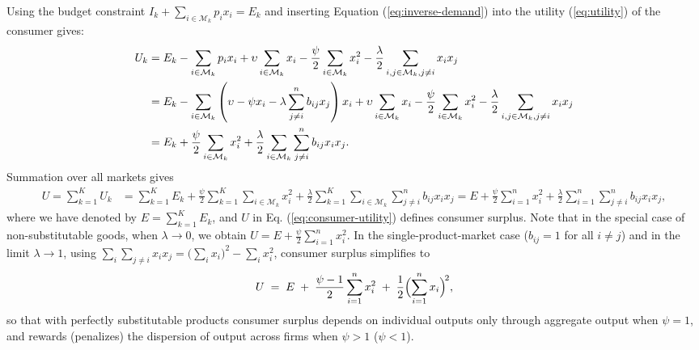 Using the budget constraint $I_k + \sum_{i \in \mathcal{M}_k} p_i x_i = E_k$ and inserting Equation (\ref{eq:inverse-demand}) into the utility (\ref{eq:utility}) of the consumer gives: 
\begin{align*}
U_k & = E_k - \sum_{i \in \mathcal{M}_k} p_i x_i + \upsilon \sum_{i \in \mathcal{M}_k} x_i - \frac{\psi}{2} \sum_{i \in \mathcal{M}_k} x_i^2 - \frac{\lambda}{2} \sum_{\substack{i,j \in \mathcal{M}_k, j \neq i}} x_i x_j \notag \\
& = E_k - \sum_{i \in \mathcal{M}_k} \left( \upsilon - \psi x_i - \lambda \sum_{j \ne i}^n b_{ij} x_j \right) x_i + \upsilon \sum_{i \in \mathcal{M}_k} x_i - \frac{\psi}{2} \sum_{i \in \mathcal{M}_k} x_i^2 -\frac{\lambda}{2} \sum_{\substack{i,j \in \mathcal{M}_k, j \neq i}} x_i x_j \notag \\
& = E_k + \frac{\psi}{2} \sum_{i \in \mathcal{M}_k} x_i^2 + \frac{\lambda}{2} \sum_{i \in \mathcal{M}_k} \sum_{j \ne i}^n b_{ij} x_i x_j. 
\end{align*}
Summation over all markets gives
\begin{align}
U = \sum_{k=1}^K U_k & = \sum_{k=1}^K E_k + \frac{\psi}{2} \sum_{k=1}^K \sum_{i \in \mathcal{M}_k} x_i^2 + \frac{\lambda}{2} \sum_{k=1}^K \sum_{i \in \mathcal{M}_k} \sum_{j \ne i}^n b_{ij} x_i x_j 
 = E + \frac{\psi}{2} \sum_{i=1}^n x_i^2 + \frac{\lambda}{2} \sum_{i=1}^n \sum_{j \ne i}^n b_{ij} x_i x_j,
\label{eq:consumer-utility}
\end{align}
where we have denoted by $E = \sum_{k=1}^K E_k$, and $U$ in Eq. (\ref{eq:consumer-utility}) defines consumer surplus. Note that in the special case of non-substitutable goods, when $\lambda \to 0$, we obtain $U = E +\frac{\psi}{2} \sum_{i=1}^n x_i^2$.  %
In the single-product-market case ($b_{ij} = 1$ for all $i \neq j$) and
in the limit $\lambda \to 1$, using
$\sum_{i}\sum_{j \neq i} x_i x_j = \bigl(\sum_i x_i\bigr)^2 - \sum_i
x_i^2$, consumer surplus simplifies to
\begin{equation}
  U
  \;=\;
  E
  \;+\;
  \frac{\psi - 1}{2} \sum_{i=1}^n x_i^2
  \;+\;
  \frac{1}{2} \Bigl( \sum_{i=1}^n x_i \Bigr)^{\!2},
  \label{eq:cs-single-market-limit}
\end{equation}
so that with perfectly substitutable products consumer surplus depends
on individual outputs only through aggregate output when $\psi = 1$,
and rewards (penalizes) the dispersion of output across firms when
$\psi > 1$ ($\psi < 1$).

